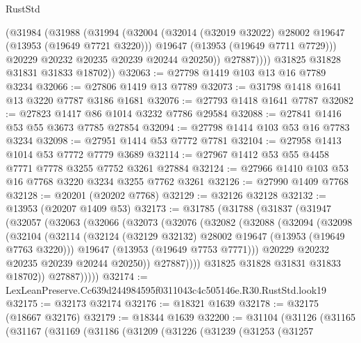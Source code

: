 \begin{lexlean}{RustStd}
\begin{coremodule}
              (@31984
                (@31988
                  (@31994
                    (@32004
                      (@32014 (@32019 @32022) @28002 @19647 (@13953 (@19649 @7721 @3220)))
                      @19647
                      (@13953 (@19649 @7711 @7729)))
                    @20229
                    @20232
                    @20235
                    @20239
                    @20244
                    @20250))
                @27887))))
        @31825
        @31828
        @31831
        @31833
        @18702))
@32063 := @27798 @1419 @103 @13 @16 @7789 @3234
@32066 := @27806 @1419 @13 @7789
@32073 := @31798 @1418 @1641 @13 @3220 @7787 @3186 @1681
@32076 := @27793 @1418 @1641 @7787
@32082 := @27823 @1417 @86 @1014 @3232 @7786 @29584
@32088 := @27841 @1416 @53 @55 @3673 @7785 @27854
@32094 := @27798 @1414 @103 @53 @16 @7783 @3234
@32098 := @27951 @1414 @53 @7772 @7781
@32104 := @27958 @1413 @1014 @53 @7772 @7779 @3689
@32114 := @27967 @1412 @53 @55 @4458 @7771 @7778 @3255 @7752 @3261 @27884
@32124 := @27966 @1410 @103 @53 @16 @7768 @3220 @3234 @3255 @7762 @3261
@32126 := @27990 @1409 @7768
@32128 := @20201 (@20202 @7768)
@32129 := @32126 @32128
@32132 := @13953 (@20207 @1409 @53)
@32173 := @31785
    (@31788
      (@31837
        (@31947
          (@32057
            (@32063
              (@32066
                (@32073
                  (@32076
                    (@32082
                      (@32088
                        (@32094
                          (@32098
                            (@32104
                              (@32114
                                (@32124 (@32129 @32132) @28002 @19647 (@13953 (@19649 @7763 @3220)))
                                @19647
                                (@13953 (@19649 @7753 @7771)))
                              @20229
                              @20232
                              @20235
                              @20239
                              @20244
                              @20250))
                          @27887))))
                  @31825
                  @31828
                  @31831
                  @31833
                  @18702))
              @27887)))))
@32174 := LexLeanPreserve.Cc639d244984595f0311043c4c505146e.R30.RustStd.look19
@32175 := @32173 @32174
@32176 := @18321 @1639
@32178 := @32175 (@18667 @32176)
@32179 := @18344 @1639
@32200 := @31104
    (@31126
      (@31165
        (@31167
          (@31169
            (@31186
              (@31209
                (@31226
                  (@31239
                    (@31253
                      (@31257

\end{coremodule}
\end{lexlean}
